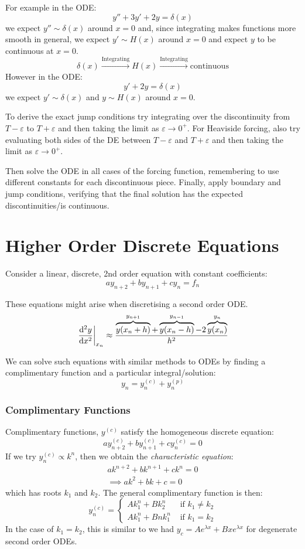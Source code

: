 \documentclass[../main.tex]{subfiles}
\begin{document}
For example in the ODE:
\[
  y'' + 3y' + 2y = \delta(x)
\]
we expect $y'' \sim \delta(x)$ around $x = 0$ and, since integrating makes functions more smooth in general, we expect $y' \sim H(x)$ around $x = 0$ and expect $y$ to be continuous at $x = 0$.
\[
  \delta(x) \xrightarrow{\text{Integrating}} H(x) \xrightarrow{\text{Integrating}} \text{continuous}
\]
However in the ODE:
\[
  y' + 2y = \delta(x)
\]
we expect $y' \sim \delta(x)$ and $y \sim H(x)$ around $x = 0$.

To derive the exact jump conditions try integrating over the discontinuity from $T - \varepsilon$ to $T + \varepsilon$ and then taking the limit as $\varepsilon \to 0^+$.
For Heaviside forcing, also try evaluating both sides of the DE between $T - \varepsilon$ and $T + \varepsilon$ and then taking the limit as $\varepsilon \to 0^+$.

Then solve the ODE in all cases of the forcing function, remembering to use different constants for each discontinuous piece.
Finally, apply boundary and jump conditions, verifying that the final solution has the expected discontinuities/is continuous.
\section{Higher Order Discrete Equations}
Consider a linear, discrete, 2nd order equation with constant coefficients:
\[
  ay_{n + 2} + by_{n + 1} + cy_n = f_n
\]
\begin{remark}[Note]
These equations might arise when discretising a second order ODE.
\[
  \at{\deriv[2]{y}{x}}{x_n} \approx \frac{\overbrace{y(x_n + h)}^{y_{n + 1}} + \overbrace{y(x_n - h)}^{y_{n - 1}} - 2\overbrace{y(x_n)}^{y_n}}{h^2}
\]
\end{remark}
We can solve such equations with similar methods to ODEs by finding a complimentary function and a particular integral/solution:
\[
  y_n = y^{(c)}_n + y^{(p)}_n
\]
\subsubsection{Complimentary Functions}
Complimentary functions, $y^{(c)}$ satisfy the homogeneous discrete equation:
\[
  ay^{(c)}_{n + 2} + by^{(c)}_{n + 1} + cy^{(c)}_n = 0
\]
If we try $y^{(c)}_n \propto k^{n}$, then we obtain the \textit{characteristic equation}:
\begin{align*}
  ak^{n + 2} + bk^{n + 1} + ck^{n} = 0 \\
  \implies ak^2 + bk + c = 0
\end{align*}
which has roots $k_1$ and $k_2$.
The general complimentary function is then:
\[
  y^{(c)}_n  = \begin{cases}
  Ak^{n}_{1} + Bk^{n}_{2} & \text{ if } k_1 \neq k_2 \\
  Ak^{n}_{1} + Bnk^{n}_1 & \text{ if } k_1 = k_2
  \end{cases}
\]
In the case of $k_1 = k_2$, this is similar to we had $y_c = Ae^{\lambda x} + Bxe^{\lambda x}$ for degenerate second order ODEs.
\end{document}
